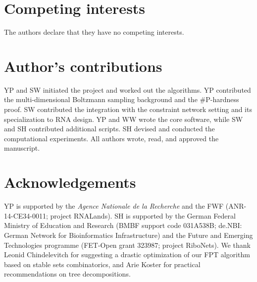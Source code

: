 \documentclass{bmcart}
\begin{document}

\begin{backmatter}

\section*{Competing interests}
  The authors declare that they have no competing interests.

\section*{Author's contributions}
  YP and SW initiated the project and worked out the algorithms.
  YP contributed the multi-dimensional Boltzmann sampling background and the \#P-hardness proof.
  SW contributed the integration with the constraint network setting and its specialization to RNA design.
  YP and WW wrote the core software, while SW and SH contributed additional scripts. SH devised and conducted the computational experiments. All authors wrote, read, and approved the manuscript.

\section*{Acknowledgements}
YP is supported
by the
{\em Agence
  Nationale de la Recherche} and the
FWF (ANR-14-CE34-0011; project RNALands).  SH is supported by the
German Federal Ministry of Education and Research (BMBF support code
031A538B; de.NBI: German Network for Bioinformatics Infrastructure)
and the
Future and Emerging Technologies programme
(FET-Open grant 323987; project RiboNets).
%
We thank Leonid Chindelevitch for suggesting a drastic optimization of our FPT algorithm based on stable sets combinatorics, and Arie Koster for practical recommendations on tree decompositions.


\end{backmatter}
\end{document}

